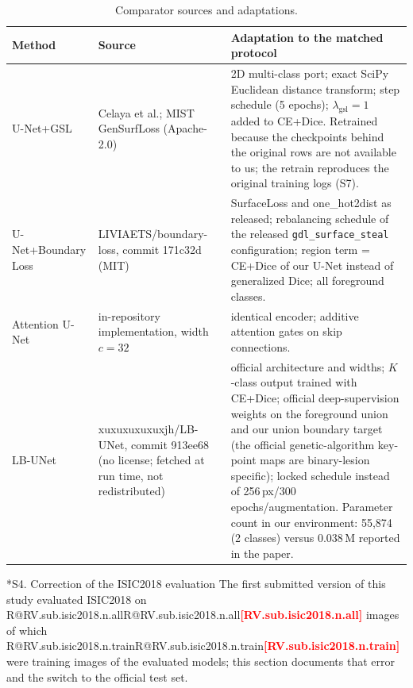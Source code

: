\documentclass[10pt]{article}
\makeatletter
\newcommand{\R}[1]{\ifcsname R@#1\endcsname\csname R@#1\endcsname\else\textbf{\textcolor{red}{[#1]}}\fi}
\renewcommand\section{\@startsection{section}{1}{\z@}{-2.4ex \@plus -1ex \@minus -.2ex}{1.2ex \@plus .2ex}{\normalfont\large\bfseries}}
\makeatother
\begin{document}
\begin{table}[!htbp]\centering\small
\begin{tabular}{p{2.6cm}p{4.5cm}p{8.2cm}}
\toprule
Method & Source & Adaptation to the matched protocol \\
\midrule
U-Net+GSL & Celaya et al.; MIST GenSurfLoss (Apache-2.0) & 2D multi-class port; exact SciPy Euclidean distance transform; step schedule (5 epochs); $\lambda_{\mathrm{gsl}}=1$ added to CE+Dice. Retrained because the checkpoints behind the original rows are not available to us; the retrain reproduces the original training logs (S7). \\
U-Net+Boundary Loss & LIVIAETS/boundary-loss, commit 171c32d (MIT) & SurfaceLoss and one\_hot2dist as released; rebalancing schedule of the released \texttt{gdl\_surface\_steal} configuration; region term = CE+Dice of our U-Net instead of generalized Dice; all foreground classes. \\
Attention U-Net & in-repository implementation, width $c=32$ & identical encoder; additive attention gates on skip connections. \\
LB-UNet & xuxuxuxuxuxjh/LB-UNet, commit 913ee68 (no license; fetched at run time, not redistributed) & official architecture and widths; $K$-class output trained with CE+Dice; official deep-supervision weights on the foreground union and our union boundary target (the official genetic-algorithm key-point maps are binary-lesion specific); locked schedule instead of 256\,px/300 epochs/augmentation. Parameter count in our environment: 55,874 (2 classes) versus 0.038\,M reported in the paper. \\
\bottomrule
\end{tabular}
\caption{Comparator sources and adaptations.}
\end{table}


\section*{S4. Correction of the ISIC2018 evaluation}
The first submitted version of this study evaluated ISIC2018 on \R{RV.sub.isic2018.n.all} images of which \R{RV.sub.isic2018.n.train} were training images of the evaluated models; this section documents that error and the switch to the official test set.
\end{document}
